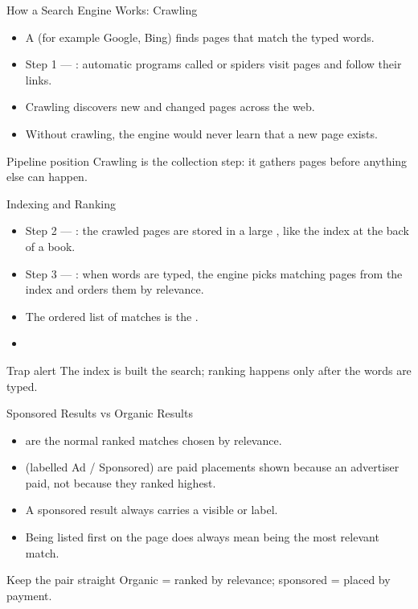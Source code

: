 \documentclass[aspectratio=169]{beamer}
\begin{document}
\begin{frame}{How a Search Engine Works: Crawling}
  \begin{itemize}
    \item A  (for example Google, Bing) finds pages that
      match the typed words.
    \item Step 1 --- : automatic programs called
       or spiders visit pages and follow their links.
    \item Crawling discovers new and changed pages across the web.
    \item Without crawling, the engine would never learn that a new page
      exists.
  \end{itemize}
  \begin{block}{Pipeline position}
    Crawling is the collection step: it gathers pages before anything else
    can happen.
  \end{block}
\end{frame}

\begin{frame}{Indexing and Ranking}
  \begin{itemize}
    \item Step 2 --- : the crawled pages are stored in a large
      , like the index at the back of a book.
    \item Step 3 --- : when words are typed, the engine picks
      matching pages from the index and orders them by relevance.
    \item The ordered list of matches is the .
    \item {}
  \end{itemize}
  \begin{alertblock}{Trap alert}
    The index is built  the search; ranking happens only after
    the words are typed.
  \end{alertblock}
\end{frame}

\begin{frame}{Sponsored Results vs Organic Results}
  \begin{itemize}
    \item {} are the normal ranked matches chosen by
      relevance.
    \item {} (labelled Ad / Sponsored) are paid
      placements shown because an advertiser paid, not because they ranked
      highest.
    \item A sponsored result always carries a visible  or
       label.
    \item Being listed first on the page does  always mean being
      the most relevant match.
  \end{itemize}
  \begin{block}{Keep the pair straight}
    Organic = ranked by relevance; sponsored = placed by payment.
  \end{block}
\end{frame}
\end{document}
